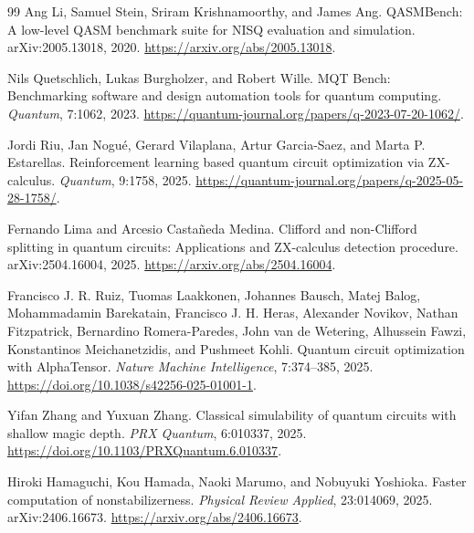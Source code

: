 \documentclass[11pt]{article}
\theoremstyle{remark}
\begin{document}
\begin{thebibliography}{99}
Ang Li, Samuel Stein, Sriram Krishnamoorthy, and James Ang.
\newblock QASMBench: A low-level QASM benchmark suite for NISQ evaluation and simulation.
\newblock arXiv:2005.13018, 2020.
\newblock \url{https://arxiv.org/abs/2005.13018}.

Nils Quetschlich, Lukas Burgholzer, and Robert Wille.
\newblock MQT Bench: Benchmarking software and design automation tools for quantum computing.
\newblock \emph{Quantum}, 7:1062, 2023.
\newblock \url{https://quantum-journal.org/papers/q-2023-07-20-1062/}.

Jordi Riu, Jan Nogu\'e, Gerard Vilaplana, Artur Garcia-Saez, and Marta P. Estarellas.
\newblock Reinforcement learning based quantum circuit optimization via ZX-calculus.
\newblock \emph{Quantum}, 9:1758, 2025.
\newblock \url{https://quantum-journal.org/papers/q-2025-05-28-1758/}.

Fernando Lima and Arcesio Casta\~neda Medina.
\newblock Clifford and non-Clifford splitting in quantum circuits: Applications and ZX-calculus detection procedure.
\newblock arXiv:2504.16004, 2025.
\newblock \url{https://arxiv.org/abs/2504.16004}.

Francisco J. R. Ruiz, Tuomas Laakkonen, Johannes Bausch, Matej Balog, Mohammadamin Barekatain, Francisco J. H. Heras, Alexander Novikov, Nathan Fitzpatrick, Bernardino Romera-Paredes, John van de Wetering, Alhussein Fawzi, Konstantinos Meichanetzidis, and Pushmeet Kohli.
\newblock Quantum circuit optimization with AlphaTensor.
\newblock \emph{Nature Machine Intelligence}, 7:374--385, 2025.
\newblock \url{https://doi.org/10.1038/s42256-025-01001-1}.

Yifan Zhang and Yuxuan Zhang.
\newblock Classical simulability of quantum circuits with shallow magic depth.
\newblock \emph{PRX Quantum}, 6:010337, 2025.
\newblock \url{https://doi.org/10.1103/PRXQuantum.6.010337}.

Hiroki Hamaguchi, Kou Hamada, Naoki Marumo, and Nobuyuki Yoshioka.
\newblock Faster computation of nonstabilizerness.
\newblock \emph{Physical Review Applied}, 23:014069, 2025.
\newblock arXiv:2406.16673.
\newblock \url{https://arxiv.org/abs/2406.16673}.

\end{thebibliography}
\end{document}
